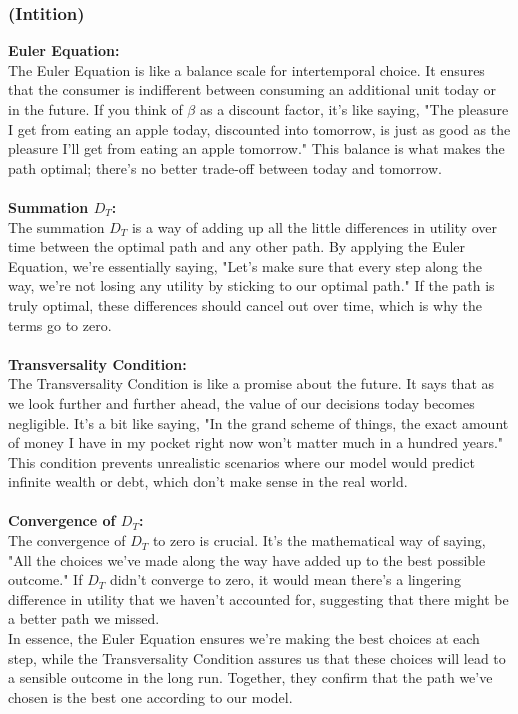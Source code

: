 \documentclass[12pt]{extarticle}
\def\secondarycolor{Golden}
\newcommand{\partof}[1]{
    \subsubsection*{\textcolor{\secondarycolor}{(#1)}}
    \addcontentsline{toc}{subsubsection}{\protect\numberline{}#1}
}
\begin{document}
\partof{Intition}
\textbf{Euler Equation:}\\
The Euler Equation is like a balance scale for intertemporal choice. It ensures that the consumer is indifferent between consuming an additional unit today or in the future. If you think of $ \beta $ as a discount factor, it's like saying, "The pleasure I get from eating an apple today, discounted into tomorrow, is just as good as the pleasure I'll get from eating an apple tomorrow." This balance is what makes the path optimal; there's no better trade-off between today and tomorrow.\\\\
\textbf{Summation $ D_T $:}\\
The summation $ D_T $ is a way of adding up all the little differences in utility over time between the optimal path and any other path. By applying the Euler Equation, we're essentially saying, "Let's make sure that every step along the way, we're not losing any utility by sticking to our optimal path." If the path is truly optimal, these differences should cancel out over time, which is why the terms go to zero.\\\\
\textbf{Transversality Condition:}\\
The Transversality Condition is like a promise about the future. It says that as we look further and further ahead, the value of our decisions today becomes negligible. It's a bit like saying, "In the grand scheme of things, the exact amount of money I have in my pocket right now won't matter much in a hundred years." This condition prevents unrealistic scenarios where our model would predict infinite wealth or debt, which don't make sense in the real world.\\\\
\textbf{Convergence of $ D_T $:}\\
The convergence of $ D_T $ to zero is crucial. It's the mathematical way of saying, "All the choices we've made along the way have added up to the best possible outcome." If $ D_T $ didn't converge to zero, it would mean there's a lingering difference in utility that we haven't accounted for, suggesting that there might be a better path we missed.\\
In essence, the Euler Equation ensures we're making the best choices at each step, while the Transversality Condition assures us that these choices will lead to a sensible outcome in the long run. Together, they confirm that the path we've chosen is the best one according to our model.\\\\
\end{document}
